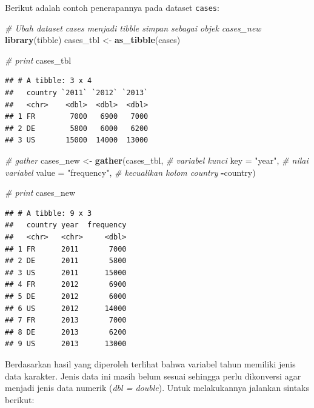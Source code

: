 \documentclass[]{book}
\newenvironment{Shaded}{\begin{snugshade}}{\end{snugshade}}
\newcommand{\KeywordTok}[1]{\textcolor[rgb]{0.13,0.29,0.53}{\textbf{#1}}}
\newcommand{\DataTypeTok}[1]{\textcolor[rgb]{0.13,0.29,0.53}{#1}}
\newcommand{\StringTok}[1]{\textcolor[rgb]{0.31,0.60,0.02}{#1}}
\newcommand{\CommentTok}[1]{\textcolor[rgb]{0.56,0.35,0.01}{\textit{#1}}}
\newcommand{\OperatorTok}[1]{\textcolor[rgb]{0.81,0.36,0.00}{\textbf{#1}}}
\newcommand{\NormalTok}[1]{#1}
\begin{document}
Berikut adalah contoh penerapannya pada dataset \texttt{cases}:

\begin{Shaded}
\begin{Highlighting}[]
\CommentTok{# Ubah dataset cases menjadi tibble simpan sebagai objek cases_new}
\KeywordTok{library}\NormalTok{(tibble)}
\NormalTok{cases_tbl <-}\StringTok{ }\KeywordTok{as_tibble}\NormalTok{(cases)}

\CommentTok{# print}
\NormalTok{cases_tbl}
\end{Highlighting}
\end{Shaded}

\begin{verbatim}
## # A tibble: 3 x 4
##   country `2011` `2012` `2013`
##   <chr>    <dbl>  <dbl>  <dbl>
## 1 FR        7000   6900   7000
## 2 DE        5800   6000   6200
## 3 US       15000  14000  13000
\end{verbatim}

\begin{Shaded}
\begin{Highlighting}[]
\CommentTok{# gather}
\NormalTok{cases_new <-}\StringTok{ }\KeywordTok{gather}\NormalTok{(cases_tbl, }
                    \CommentTok{# variabel kunci}
                    \DataTypeTok{key =} \StringTok{"year"}\NormalTok{,}
                    \CommentTok{# nilai variabel}
                    \DataTypeTok{value =} \StringTok{"frequency"}\NormalTok{,}
                    \CommentTok{# kecualikan kolom country}
                    \OperatorTok{-}\NormalTok{country)}

\CommentTok{# print}
\NormalTok{cases_new}
\end{Highlighting}
\end{Shaded}

\begin{verbatim}
## # A tibble: 9 x 3
##   country year  frequency
##   <chr>   <chr>     <dbl>
## 1 FR      2011       7000
## 2 DE      2011       5800
## 3 US      2011      15000
## 4 FR      2012       6900
## 5 DE      2012       6000
## 6 US      2012      14000
## 7 FR      2013       7000
## 8 DE      2013       6200
## 9 US      2013      13000
\end{verbatim}

Berdasarkan hasil yang diperoleh terlihat bahwa variabel tahun memiliki
jenis data karakter. Jenis data ini masih belum sesuai sehingga perlu
dikonversi agar menjadi jenis data numerik (\emph{dbl = double}). Untuk
melakukannya jalankan sintaks berikut:
\end{document}

